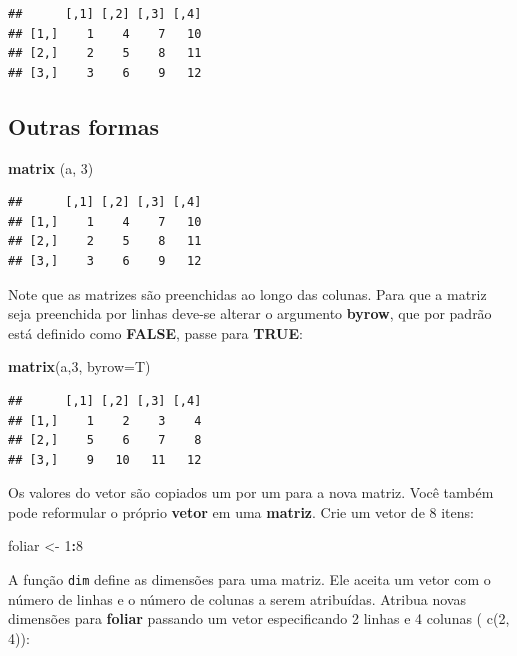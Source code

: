 \documentclass[
]{book}
\newenvironment{Shaded}{\begin{snugshade}}{\end{snugshade}}
\newcommand{\DataTypeTok}[1]{\textcolor[rgb]{0.13,0.29,0.53}{#1}}
\newcommand{\DecValTok}[1]{\textcolor[rgb]{0.00,0.00,0.81}{#1}}
\newcommand{\KeywordTok}[1]{\textcolor[rgb]{0.13,0.29,0.53}{\textbf{#1}}}
\newcommand{\NormalTok}[1]{#1}
\newcommand{\OperatorTok}[1]{\textcolor[rgb]{0.81,0.36,0.00}{\textbf{#1}}}
\newcommand{\StringTok}[1]{\textcolor[rgb]{0.31,0.60,0.02}{#1}}
\begin{document}
\begin{verbatim}
##      [,1] [,2] [,3] [,4]
## [1,]    1    4    7   10
## [2,]    2    5    8   11
## [3,]    3    6    9   12
\end{verbatim}

\hypertarget{outras-formas}{%
\subsection{Outras formas}\label{outras-formas}}

\begin{Shaded}
\begin{Highlighting}[]
\KeywordTok{matrix}\NormalTok{ (a, }\DecValTok{3}\NormalTok{)}
\end{Highlighting}
\end{Shaded}

\begin{verbatim}
##      [,1] [,2] [,3] [,4]
## [1,]    1    4    7   10
## [2,]    2    5    8   11
## [3,]    3    6    9   12
\end{verbatim}

Note que as matrizes são preenchidas ao longo das colunas. Para que a matriz seja preenchida por linhas deve-se alterar o argumento \textbf{byrow}, que por padrão está definido como \textbf{FALSE}, passe para \textbf{TRUE}:

\begin{Shaded}
\begin{Highlighting}[]
\KeywordTok{matrix}\NormalTok{(a,}\DecValTok{3}\NormalTok{, }\DataTypeTok{byrow=}\NormalTok{T)}
\end{Highlighting}
\end{Shaded}

\begin{verbatim}
##      [,1] [,2] [,3] [,4]
## [1,]    1    2    3    4
## [2,]    5    6    7    8
## [3,]    9   10   11   12
\end{verbatim}

Os valores do vetor são copiados um por um para a nova matriz. Você também pode reformular o próprio \textbf{vetor} em uma \textbf{matriz}. Crie um vetor de 8 itens:

\begin{Shaded}
\begin{Highlighting}[]
\NormalTok{foliar <-}\StringTok{ }\DecValTok{1}\OperatorTok{:}\DecValTok{8}
\end{Highlighting}
\end{Shaded}

A função \texttt{dim} define as dimensões para uma matriz. Ele aceita um vetor com o número de linhas e o número de colunas a serem atribuídas.
Atribua novas dimensões para \textbf{foliar} passando um vetor especificando 2 linhas e 4 colunas ( c(2, 4)):
\end{document}
